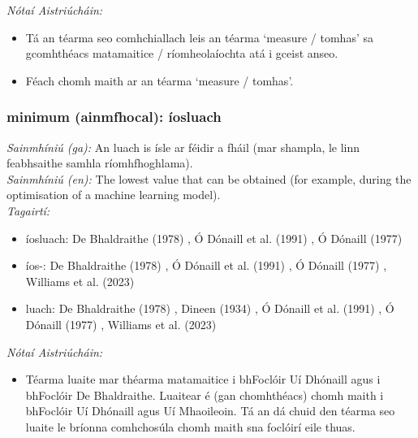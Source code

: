  \noindent \textit{Nótaí Aistriúcháin:}
\begin{itemize}
	\item Tá an téarma seo comhchiallach leis an téarma `measure / tomhas' sa gcomhthéacs matamaitice / ríomheolaíochta atá i gceist anseo.
	\item Féach chomh maith ar an téarma `measure / tomhas'.
\end{itemize}


\subsubsection*{minimum (ainmfhocal): íosluach}
 \noindent \textit{Sainmhíniú (ga):} An luach is ísle ar féidir a fháil (mar shampla, le linn feabhsaithe samhla ríomhfhoghlama).
\\
 \noindent \textit{Sainmhíniú (en):} The lowest value that can be obtained (for example, during the optimisation of a machine learning model).
\\
 \noindent \textit{Tagairtí:}
\begin{itemize}
	\item íosluach: De Bhaldraithe (1978) \cite{de-bhaldraithe}, Ó Dónaill et al. (1991) \cite{focloir-beag}, Ó Dónaill (1977) \cite{odonaill}
	\item íos-: De Bhaldraithe (1978) \cite{de-bhaldraithe}, Ó Dónaill et al. (1991) \cite{focloir-beag}, Ó Dónaill (1977) \cite{odonaill}, Williams et al. (2023) \cite{storchiste}
	\item luach: De Bhaldraithe (1978) \cite{de-bhaldraithe}, Dineen (1934) \cite{dineen}, Ó Dónaill et al. (1991) \cite{focloir-beag}, Ó Dónaill (1977) \cite{odonaill}, Williams et al. (2023) \cite{storchiste}
\end{itemize}

 \noindent \textit{Nótaí Aistriúcháin:}
\begin{itemize}
	\item Téarma luaite mar théarma matamaitice i bhFoclóir Uí Dhónaill agus i bhFoclóir De Bhaldraithe. Luaitear é (gan chomhthéacs) chomh maith i bhFoclóir Uí Dhónaill agus Uí Mhaoileoin. Tá an dá chuid den téarma seo luaite le bríonna comhchosúla chomh maith sna foclóirí eile thuas.
\end{itemize}


